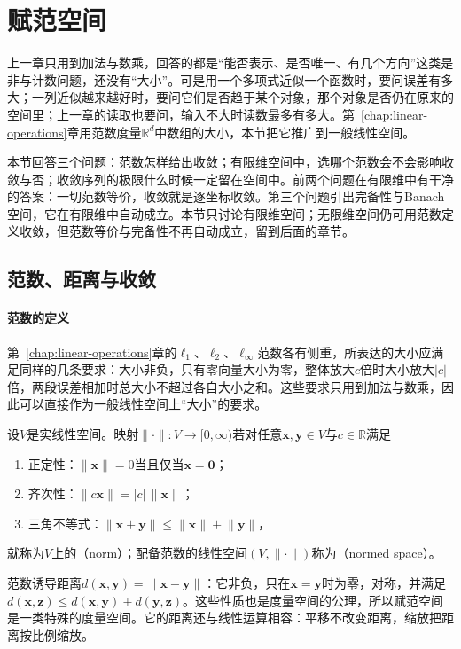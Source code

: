 
\section{赋范空间}
\label{sec:ls-normed-spaces}

上一章只用到加法与数乘，回答的都是“能否表示、是否唯一、有几个方向”这类是非与计数问题，还没有“大小”。可是用一个多项式近似一个函数时，要问误差有多大；一列近似越来越好时，要问它们是否趋于某个对象，那个对象是否仍在原来的空间里；上一章的读取也要问，输入不大时读数最多有多大。第~\ref{chap:linear-operations}章用范数度量$\mathbb R^d$中数组的大小，本节把它推广到一般线性空间。

本节回答三个问题：范数怎样给出收敛；有限维空间中，选哪个范数会不会影响收敛与否；收敛序列的极限什么时候一定留在空间中。前两个问题在有限维中有干净的答案：一切范数等价，收敛就是逐坐标收敛。第三个问题引出完备性与Banach空间，它在有限维中自动成立。本节只讨论有限维空间；无限维空间仍可用范数定义收敛，但范数等价与完备性不再自动成立，留到后面的章节。

\subsection{范数、距离与收敛}
\label{sec:ls-normed-space-definition}

\paragraph{范数的定义}
第~\ref{chap:linear-operations}章的$\ell_1$、$\ell_2$、$\ell_\infty$范数各有侧重，所表达的大小应满足同样的几条要求：大小非负，只有零向量大小为零，整体放大$c$倍时大小放大$|c|$倍，两段误差相加时总大小不超过各自大小之和。这些要求只用到加法与数乘，因此可以直接作为一般线性空间上“大小”的要求。
\begin{definition}[赋范空间]
\label{def:ls-normed-space}
\label{def:functional-normed-space}
设$V$是实线性空间。映射$\lVert\cdot\rVert:V\to[0,\infty)$若对任意$\bm x,\bm y\in V$与$c\in\mathbb R$满足
\begin{enumerate}
 \item 正定性：$\lVert\bm x\rVert=0$当且仅当$\bm x=\bm0$；
 \item 齐次性：$\lVert c\bm x\rVert=|c|\,\lVert\bm x\rVert$；
 \item 三角不等式：$\lVert\bm x+\bm y\rVert\leq\lVert\bm x\rVert+\lVert\bm y\rVert$，
\end{enumerate}
就称为$V$上的（norm）；配备范数的线性空间$(V,\lVert\cdot\rVert)$称为（normed space）。
\end{definition}
范数诱导距离$d(\bm x,\bm y)=\lVert\bm x-\bm y\rVert$：它非负，只在$\bm x=\bm y$时为零，对称，并满足$d(\bm x,\bm z)\leq d(\bm x,\bm y)+d(\bm y,\bm z)$。这些性质也是度量空间的公理，所以赋范空间是一类特殊的度量空间。它的距离还与线性运算相容：平移不改变距离，缩放把距离按比例缩放。

